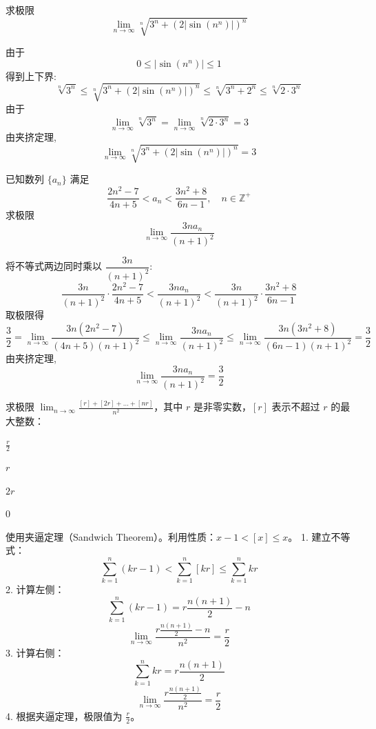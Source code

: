 \begin{questions}
    \question 求极限
    \[
    \lim_{n \to \infty} \sqrt[n]{3^n + (2|\sin(n^n)|)^n}
    \]
    \begin{solution}
        由于 
        \[
        0 \le |\sin(n^n)| \le 1
        \]
        得到上下界:
        \[
        \sqrt[n]{3^n} \le \sqrt[n]{3^n + (2|\sin(n^n)|)^n} \le \sqrt[n]{3^n + 2^n} \le \sqrt[n]{2 \cdot 3^n}
        \]
        由于
        \[
        \lim_{n \to \infty} \sqrt[n]{3^n} = 
        \lim_{n \to \infty} \sqrt[n]{2 \cdot 3^n}  = 3
        \]
        由夹挤定理,
        \[
        \lim_{n \to \infty} \sqrt[n]{3^n + (2|\sin(n^n)|)^n} = 3
        \]
    \end{solution}

    \question 已知数列 $\{a_n\}$ 满足
    \[
    \frac{2n^2-7}{4n+5} < a_n < \frac{3n^2+8}{6n-1}, \quad n \in \mathbb{Z}^+
    \]
    求极限
    \[
    \lim_{n \to \infty} \frac{3 n a_n}{(n+1)^2}
    \]
    \begin{solution}
        将不等式两边同时乘以 $\dfrac{3n}{(n+1)^2}$:
        \[
        \frac{3n}{(n+1)^2} \cdot \frac{2n^2-7}{4n+5} < \frac{3 n a_n}{(n+1)^2} < \frac{3n}{(n+1)^2} \cdot \frac{3n^2+8}{6n-1}
        \]
        取极限得
        \[
        \frac{3}{2}=\lim_{n \to \infty} \frac{3n(2n^2-7)}{(4n+5)(n+1)^2} \le \lim_{n \to \infty} \frac{3 n a_n}{(n+1)^2} \le \lim_{n \to \infty} \frac{3n(3n^2+8)}{(6n-1)(n+1)^2} =\frac{3}{2}
        \]
        由夹挤定理,
        \[
        \lim_{n \to \infty} \frac{3 n a_n}{(n+1)^2} = \frac{3}{2}
        \]
    \end{solution}

    \question 
求极限 $\lim_{n \to \infty} \frac{[r] + [2r] + \dots + [nr]}{n^2}$，其中 $r$ 是非零实数，$[r]$ 表示不超过 $r$ 的最大整数：
\begin{choices}
    \item $\frac{r}{2}$
    \item $r$
    \item $2r$
    \item 0
\end{choices}

\begin{solution}
使用夹逼定理（Sandwich Theorem）。利用性质：$x - 1 < [x] \leq x$。
1. 建立不等式：
   \[ \sum_{k=1}^{n} (kr - 1) < \sum_{k=1}^{n} [kr] \leq \sum_{k=1}^{n} kr \]
2. 计算左侧：
   \[ \sum_{k=1}^{n} (kr - 1) = r \frac{n(n+1)}{2} - n \]
   \[ \lim_{n \to \infty} \frac{r \frac{n(n+1)}{2} - n}{n^2} = \frac{r}{2} \]
3. 计算右侧：
   \[ \sum_{k=1}^{n} kr = r \frac{n(n+1)}{2} \]
   \[ \lim_{n \to \infty} \frac{r \frac{n(n+1)}{2}}{n^2} = \frac{r}{2} \]
4. 根据夹逼定理，极限值为 $\frac{r}{2}$。


\end{solution}
\end{questions}
